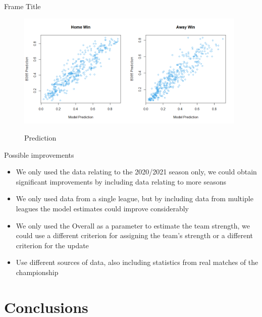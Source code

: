 \documentclass[aspectratio=169,xcolor=dvipsnames]{beamer}
\begin{document}
\begin{frame}{Frame Title}
    \begin{figure}[ht] 
        \begin{center} 
            \includegraphics[width=11cm]{Rplot8.png}\\
         \caption{Prediction}
        \end{center}
    \end{figure}
\end{frame}


\begin{frame}{Possible improvements}
\begin{itemize}

    \item We only used the data relating to the 2020/2021 season only, we could obtain significant improvements by including data relating to more seasons
    
    \item We only used data from a single league, but by including data from multiple leagues the model estimates could improve considerably
    
    \item We only used the Overall as a parameter to estimate the team strength, we could use a different criterion for assigning the team's strength or a different criterion for the update
    
    \item Use different sources of data, also including statistics from real matches of the championship
\end{itemize}
\end{frame}


\section{Conclusions}
\end{document}
